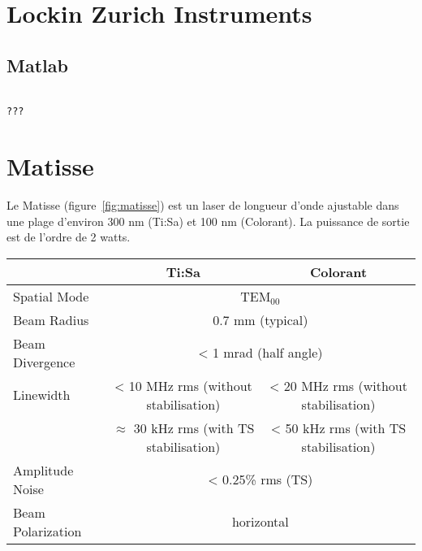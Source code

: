 \documentclass[11pt,francais]{book} %
\begin{document}

\section{Lockin Zurich Instruments}

\subsection{Matlab}

\begin{lstlisting}[frame=single,caption={Exemple d'utilisation du lockin Surich Instruments avec Matlab},label={lst:exlockinzi},breaklines=true,]  % Start your code-block
  
???
\end{lstlisting}


\section{Matisse}

Le Matisse (figure~\ref{fig:matisse}) est un laser de longueur d'onde ajustable dans une plage d'environ 300 nm (Ti:Sa) et 100 nm (Colorant).
La puissance de sortie est de l'ordre de 2 watts.

\begin{table}[htbp]
  \centering
  \begin{tabular}{lcc}
                    & Ti:Sa       & Colorant \\
    \hline
    Spatial Mode    &	\multicolumn{2}{c}{TEM$_{00}$} \\
    Beam Radius     &  \multicolumn{2}{c}{0.7 mm (typical)}  \\
    Beam Divergence & 	\multicolumn{2}{c}{< 1 mrad (half angle)} \\
    Linewidth       & 	< 10 MHz rms (without stabilisation) & < 20 MHz rms (without stabilisation)\\
    & 	$\approx$ 30 kHz rms (with TS stabilisation) & 	< 50 kHz rms (with TS stabilisation) \\
    Amplitude Noise &  	\multicolumn{2}{c}{< 0.25\% rms (TS)}\\
    Beam Polarization & 	\multicolumn{2}{c}{horizontal} \\
  \end{tabular}
  \label{tab:matisseGeneralCharacteristics}
\end{table}
\end{document}
